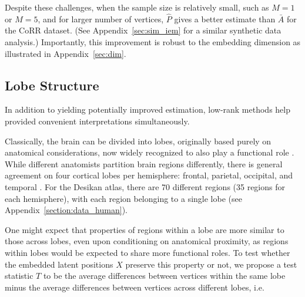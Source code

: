 \documentclass[journal,twoside,web]{ieeecolor}
\begin{document}
Despite these challenges, when the sample size is relatively small, such as $M=1$ or $M=5$, and for larger number of vertices, $\hat{P}$ gives a better estimate than $\bar{A}$ for the CoRR dataset.
(See Appendix~\ref{sec:sim_iem} for a similar synthetic data analysis.)
Importantly, this improvement is robust to the embedding dimension as illustrated in Appendix~\ref{sec:dim}.



\subsection{Lobe Structure}
\label{section:lobe_structure}
In addition to yielding potentially improved estimation, low-rank methods help provided convenient interpretations simultaneously. 

Classically, the brain can be divided into lobes, originally based purely on anatomical considerations, now widely recognized to also play a functional role \cite{Vanderah2015}.
While different anatomists partition brain regions differently, there is general agreement on four cortical lobes per hemisphere: frontal, parietal, occipital, and temporal \cite{fischl2012freesurfer,desikan2006automated,salat2004thinning}.
For the Desikan atlas, there are 70 different regions (35 regions for each hemisphere), with each region belonging to a single lobe (see Appendix~\ref{section:data_human}). 

One might expect that properties of regions within a lobe are more similar to those across lobes, even upon conditioning on anatomical proximity, as regions within lobes would be expected to share more functional roles.
To test whether the embedded latent positions $X$ preserve this property or not, we propose a test statistic $T$ to be the average differences between vertices within the same lobe minus the average differences between vertices across different lobes, i.e.
\end{document}
